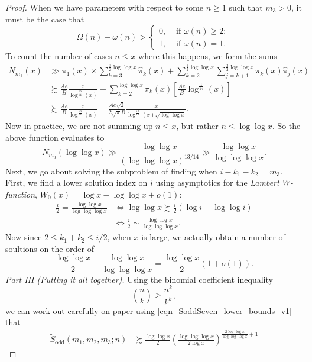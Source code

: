 \documentclass[11pt,reqno,a4letter]{article}
\numberwithin{figure}{section}
\numberwithin{table}{section}
\theoremstyle{plain}
\numberwithin{theorem}{section}
\theoremstyle{definition}
\begin{document}
\begin{proof}
When we have parameters with respect to some $n \geq 1$ 
such that $m_3 > 0$, it must be the case that 
\[
\Omega(n) - \omega(n) > \begin{cases} 
     0, & \text{ if $\omega(n) \geq 2$; } \\ 
     1, & \text{ if $\omega(n) = 1$. } 
     \end{cases}
\]
To count the number of cases $n \leq x$ where this happens, we form the sums 
\begin{align*} 
N_{m_3}(x) & \gg \pi_1(x) \times \sum_{k=3}^{\frac{3}{2} \log\log x} \widehat{\pi}_k(x) + 
     \sum_{k=2}^{\frac{3}{2} \log\log x} \sum_{j=k+1}^{\frac{3}{2} \log\log x} 
     \pi_k(x) \widehat{\pi}_j(x) \\ 
     & \succsim \frac{Ae}{B} \frac{x}{\log^{\frac{13}{14}}(x)} + 
     \sum_{k=2}^{\log\log x} \pi_k(x) \left[ 
     \frac{Ae}{B} \log^{\frac{1}{14}}(x) 
     \right] \\ 
     & \succsim \frac{Ae}{B} \frac{x}{\log^{\frac{13}{14}}(x)} + 
     \frac{Ae \sqrt{2}}{2 \sqrt{\pi} B} \frac{x}{\log^{\frac{13}{14}}(x) \sqrt{\log\log x}}. 
\end{align*} 
Now in practice, we are not summing up $n \leq x$, but rather $n \leq \log\log x$. So the 
above function evaluates to 
\[
N_{m_3}(\log\log x) \gg \frac{\log\log x}{(\log\log\log x)^{13/14}} \gg 
     \frac{\log\log x}{\log\log\log x}. 
\]
Next, we go about solving the subproblem of finding when $i-k_1-k_2 = m_3$. First, we find a lower 
solution index on $i$ using asymptotics for the \emph{Lambert $W$-function}, 
$W_0(x) = \log x - \log\log x + o(1)$: 
\begin{align*} 
\frac{i}{2} = \frac{\log\log x}{\log\log\log x} & \iff \log\log x \succsim \frac{i}{2}\left( 
     \log i + \log\log i\right) \\ 
     & \iff \frac{i}{2} \sim \frac{\log\log x}{\log\log\log x}. 
\end{align*} 
Now since $2 \leq k_1+k_2 \leq i/2$, when $x$ is large, we actually obtain a number of 
soultions on the order of 
\[
\frac{\log\log x}{2} - \frac{\log\log x}{\log\log\log x} = \frac{\log\log x}{2} (1+o(1)). 
\]
\textit{Part III (Putting it all together). } 
Using the binomial coefficient inequality 
\[
\binom{n}{k} \geq \frac{n^k}{k^k}, 
\]
we can work out carefully on paper using \eqref{eqn_SoddSeven_lower_bounds_v1} that 
\begin{align*} 
\widetilde{S}_{\operatorname{odd}}(m_1, m_2, m_3; n) & \succsim 
     \frac{\log\log x}{2} \left(\frac{\log\log\log x}{2 \log x}\right)^{\frac{2\log\log x}{\log\log\log x}+1} 

\end{align*}
\end{proof}
\end{document}
